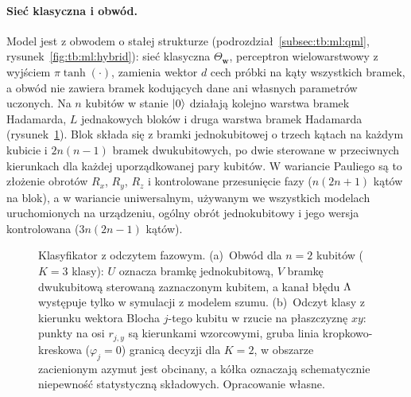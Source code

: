 \paragraph{Sieć klasyczna i obwód.}
Model jest  z obwodem o stałej strukturze (podrozdział~\ref{subsec:tb:ml:qml}, rysunek~\ref{fig:tb:ml:hybrid}): sieć klasyczna $\Theta_{\mathbf{w}}$, perceptron wielowarstwowy z wyjściem $\pi\tanh(\cdot)$, zamienia wektor $d$ cech próbki na kąty wszystkich bramek, a obwód nie zawiera bramek kodujących dane ani własnych parametrów uczonych.
Na $n$ kubitów w stanie $\ket{0}$ działają kolejno warstwa bramek Hadamarda, $L$ jednakowych bloków i druga warstwa bramek Hadamarda (rysunek~\ref{fig:cls:circuit}).
Blok składa się z bramki jednokubitowej o trzech kątach na każdym kubicie i $2n(n-1)$ bramek dwukubitowych, po dwie sterowane w przeciwnych kierunkach dla każdej uporządkowanej pary kubitów.
W wariancie Pauliego są to złożenie obrotów $R_x$, $R_y$, $R_z$ i kontrolowane przesunięcie fazy ($n(2n+1)$ kątów na blok), a w wariancie uniwersalnym, używanym we wszystkich modelach uruchomionych na urządzeniu, ogólny obrót jednokubitowy i jego wersja kontrolowana ($3n(2n-1)$ kątów).

\begin{figure}[tb]
\centering
\begin{subfigure}[c]{0.47\textwidth}
\centering

\caption{}\label{fig:cls:circuit}
\end{subfigure}\hfill
\begin{subfigure}[c]{0.52\textwidth}
\centering

\caption{}\label{fig:cls:readout}
\end{subfigure}
\caption[Klasyfikator z odczytem fazowym: obwód i odczyt klasy]{Klasyfikator z odczytem fazowym. (a)~Obwód dla $n=2$ kubitów ($K=3$ klasy): $U$ oznacza bramkę jednokubitową, $V$ bramkę dwukubitową sterowaną zaznaczonym kubitem, a kanał błędu $\Lambda$ występuje tylko w symulacji z modelem szumu. (b)~Odczyt klasy z kierunku wektora Blocha $j$-tego kubitu w rzucie na płaszczyznę $xy$: punkty na osi $r_{j,y}$ są kierunkami wzorcowymi, gruba linia kropkowo-kreskowa ($\varphi_j=0$) granicą decyzji dla $K=2$, w obszarze zacienionym azymut jest obcinany, a kółka oznaczają schematycznie niepewność statystyczną składowych. Opracowanie własne.}
\label{fig:cls:model}
\end{figure}

